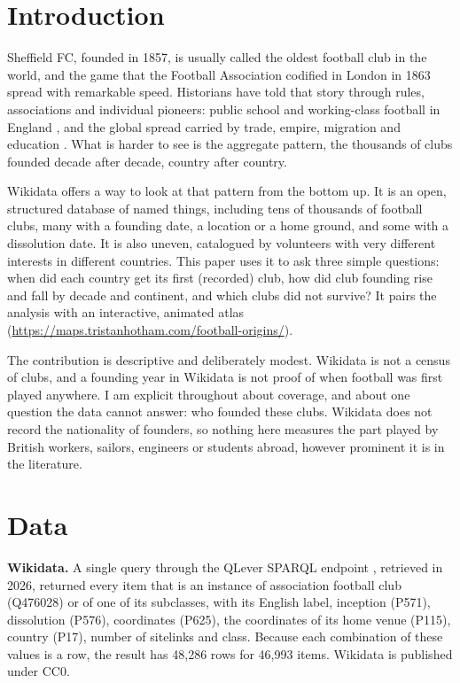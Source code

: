 \documentclass[11pt,a4paper]{article}
\begin{document}
\section{Introduction}
Sheffield FC, founded in 1857, is usually called the oldest football club in the world, and the game that the Football Association codified in London in 1863 spread with remarkable speed. Historians have told that story through rules, associations and individual pioneers: public school and working-class football in England \citep{harvey}, and the global spread carried by trade, empire, migration and education \citep{goldblatt,giulianotti}. What is harder to see is the aggregate pattern, the thousands of clubs founded decade after decade, country after country.

Wikidata \citep{wikidata} offers a way to look at that pattern from the bottom up. It is an open, structured database of named things, including tens of thousands of football clubs, many with a founding date, a location or a home ground, and some with a dissolution date. It is also uneven, catalogued by volunteers with very different interests in different countries. This paper uses it to ask three simple questions: when did each country get its first (recorded) club, how did club founding rise and fall by decade and continent, and which clubs did not survive? It pairs the analysis with an interactive, animated atlas (\url{https://maps.tristanhotham.com/football-origins/}).

The contribution is descriptive and deliberately modest. Wikidata is not a census of clubs, and a founding year in Wikidata is not proof of when football was first played anywhere. I am explicit throughout about coverage, and about one question the data cannot answer: who founded these clubs. Wikidata does not record the nationality of founders, so nothing here measures the part played by British workers, sailors, engineers or students abroad, however prominent it is in the literature.

\section{Data}
\textbf{Wikidata.} A single query through the QLever SPARQL endpoint \citep{qlever}, retrieved in 2026, returned every item that is an instance of association football club (Q476028) or of one of its subclasses, with its English label, inception (P571), dissolution (P576), coordinates (P625), the coordinates of its home venue (P115), country (P17), number of sitelinks and class. Because each combination of these values is a row, the result has 48,286 rows for 46,993 items. Wikidata is published under CC0.
\end{document}
